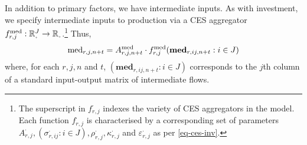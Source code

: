 \documentclass[12pt,a4paper,twoside, draft]{article}
\begin{document}
In addition to primary factors, we have intermediate inputs.
As with investment, we specify intermediate inputs to production via a CES
aggregator $f_{r, j}^{\textup{med}}: \nnreal^{J} \rightarrow
\nnreal$.\footnote{
  The superscript in $f_{r, j}^{\cdot}$ indexes the variety of CES
  aggregators in the model.
  Each function $f_{r, j}^{\cdot}$ is characterised by a corresponding
  set of parameters
  $A_{r, j}^{\cdot}, (\sigma_{r, ij}^{\cdot}: i \in J),
  \rho_{r, j}^{\cdot}, \kappa_{r, j}^{\cdot} $ and
  $\varepsilon_{r, j}^{\cdot}$ as per \cref{eq-ces-inv}.
}
Thus,
\begin{equation}\label{eq-ces-int}
  \textup{med}_{r, j, n + t} = A_{r, j, n + t} ^ \textup{med}
    \cdot f_{r, j} ^ \textup{med}(
      \mathbf{med}_{r, ij, n + t}: i \in J
      )
\end{equation}
where, for each $r, j, n$ and $t$, $(\textbf{med}_{r,ij,n + t} : i \in J)$
corresponds to the $j$th column of a standard input-output matrix of
intermediate flows.
\end{document}
